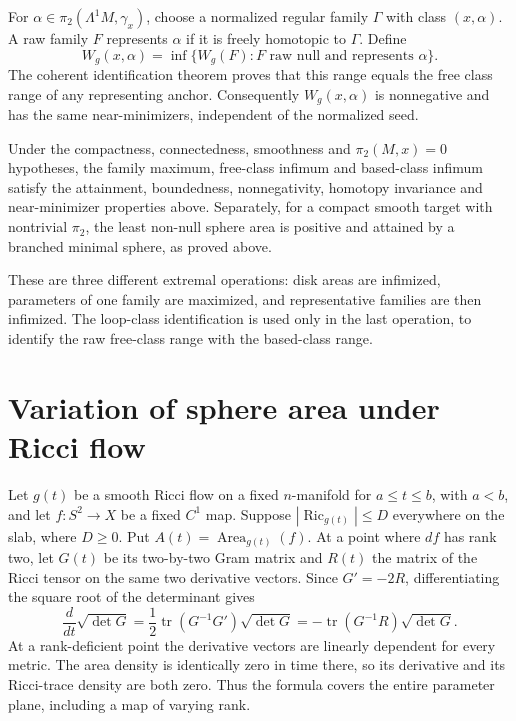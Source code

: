 For $\alpha\in\pi_2(\Lambda^1M,\gamma_x)$, choose a normalized regular
family $\Gamma$ with class $(x,\alpha)$. A raw family $F$ represents
$\alpha$ if it is freely homotopic to $\Gamma$. Define
\[
 W_g(x,\alpha)=\inf\{W_g(F):F\text{ raw null and represents }\alpha\}.
\]
The coherent identification theorem proves that this range equals the free
class range of any representing anchor. Consequently $W_g(x,\alpha)$ is
nonnegative and has the same near-minimizers, independent of the normalized
seed.

\begin{proposition}
\label{prop:filling-width-properties}
Under the compactness, connectedness, smoothness and $\pi_2(M,x)=0$ hypotheses,
the family maximum, free-class infimum and based-class infimum satisfy the
attainment, boundedness, nonnegativity, homotopy invariance and
near-minimizer properties above. Separately, for a compact smooth target
with nontrivial $\pi_2$, the least non-null sphere area is positive and
attained by a branched minimal sphere, as proved above.
\end{proposition}

These are three different extremal operations: disk areas are infimized,
parameters of one family are maximized, and representative families are
then infimized. The loop-class identification is used only in the last
operation, to identify the raw free-class range with the based-class range.

\section{Variation of sphere area under Ricci flow}
\label{sec:filling-sphere-variation}

Let $g(t)$ be a smooth Ricci flow on a fixed $n$-manifold for
$a\leq t\leq b$, with $a<b$, and let $f:S^2\to X$ be a fixed $C^1$
map. Suppose $|\operatorname{Ric}_{g(t)}|\leq D$ everywhere on the slab,
where $D\geq0$. Put $A(t)=\operatorname{Area}_{g(t)}(f)$. At a point
where $df$ has rank two, let $G(t)$ be its two-by-two Gram matrix and
$R(t)$ the matrix of the Ricci tensor on the same two derivative vectors.
Since $G'=-2R$, differentiating the square root of the determinant gives
\[
 \frac{d}{dt}\sqrt{\det G}
 =\frac12\operatorname{tr}(G^{-1}G')\sqrt{\det G}
 =-\operatorname{tr}(G^{-1}R)\sqrt{\det G}.
\]
At a rank-deficient point the derivative vectors are linearly dependent
for every metric. The area density is identically zero in time there,
so its derivative and its Ricci-trace density are both zero. Thus the
formula covers the entire parameter plane, including a map of varying rank.

